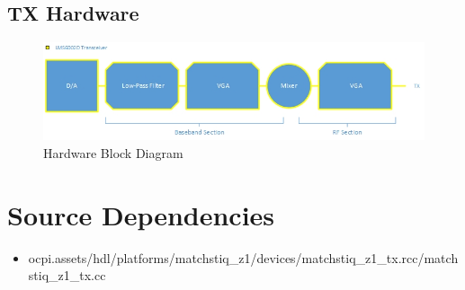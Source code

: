 \documentclass{article}
\begin{document}
\subsection*{TX Hardware}
\begin{figure}[ht]
	\centerline{\includegraphics[scale=0.7]{matchstiq_FE_TX_HW}}
	\caption{Hardware Block Diagram}
	\label{fig:hw}
\end{figure}
\vspace{25 mm}
\newpage

\section*{Source Dependencies}
\begin{itemize}
	\item ocpi.assets/hdl/platforms/matchstiq\_z1/devices/matchstiq\_z1\_tx.rcc/matchstiq\_z1\_tx.cc
\end{itemize}
\end{document}
